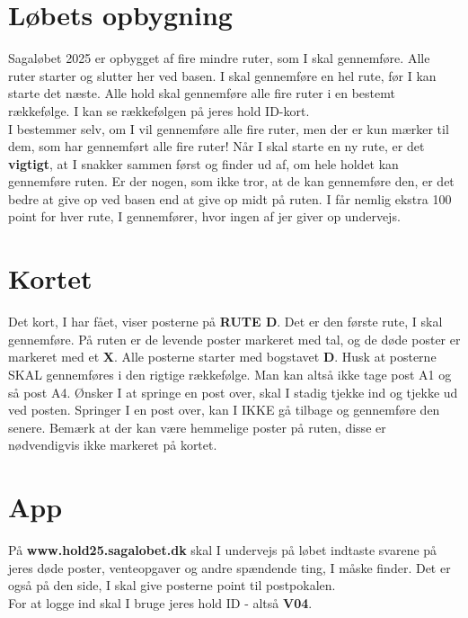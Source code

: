 \section{Løbets opbygning}
Sagaløbet 2025 er opbygget af fire mindre ruter, som I skal gennemføre. Alle ruter starter og slutter her ved basen. I skal gennemføre en hel rute, før I kan starte det næste. Alle hold skal gennemføre alle fire ruter i en bestemt rækkefølge. I kan se rækkefølgen på jeres hold ID-kort.\\\newline
I bestemmer selv, om I vil gennemføre alle fire ruter, men der er kun mærker til dem, som har gennemført alle fire ruter! Når I skal starte en ny rute, er det \textbf{vigtigt}, at I snakker sammen først og finder ud af, om hele holdet kan gennemføre ruten. Er der nogen, som ikke tror, at de kan gennemføre den, er det bedre at give op ved basen end at give op midt på ruten. I får nemlig ekstra 100 point for hver rute, I gennemfører, hvor ingen af jer giver op undervejs.\\
\section{Kortet}
Det kort, I har fået, viser posterne på \textbf{RUTE D}. Det er den første rute, I skal gennemføre. På ruten er de levende poster markeret med tal, og de døde poster er markeret med et \textbf{X}. Alle posterne starter med bogstavet \textbf{D}. Husk at posterne SKAL gennemføres i den rigtige rækkefølge. Man kan altså ikke tage post A1 og så post A4. Ønsker I at springe en post over, skal I stadig tjekke ind og tjekke ud ved posten. Springer I en post over, kan I IKKE gå tilbage og gennemføre den senere. Bemærk at der kan være hemmelige poster på ruten, disse er nødvendigvis ikke markeret på kortet.
\section{App}
På \textbf{www.hold25.sagalobet.dk} skal I undervejs på løbet indtaste svarene på jeres døde poster, venteopgaver og andre spændende ting, I måske finder. Det er også på den side, I skal give posterne point til postpokalen.\\
For at logge ind skal I bruge jeres hold ID - altså \textbf{V04}.
\newpage
